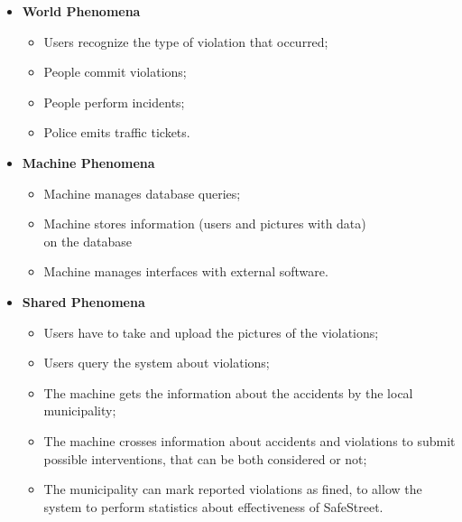 \documentclass[../RASD.tex]{subfiles}
\begin{document}
        \begin{itemize}
            \item \textbf{World Phenomena}
            \begin{itemize}
                \item Users recognize the type of violation that occurred;
                \item People commit violations;
                \item People perform incidents;
                \item Police emits traffic tickets.
            \end{itemize}
            \item \textbf{Machine Phenomena}
            \begin{itemize}
                \item Machine manages database queries;
                \item Machine stores information (users and pictures with data)
                \\ on the database
                \item Machine manages interfaces with external software.
            \end{itemize}
            \item \textbf{Shared Phenomena}
            \begin{itemize}
                \item Users have to take and upload the pictures of the violations;
                \item Users query the system about violations;
                \item The machine gets the information about the accidents by the local municipality;
                \item The machine crosses information about accidents and violations to submit possible interventions, that can be both considered or not;
                \item The municipality can mark reported violations as fined, to allow the system to perform statistics about effectiveness of SafeStreet.
            \end{itemize}
        \end{itemize}
\end{document}
